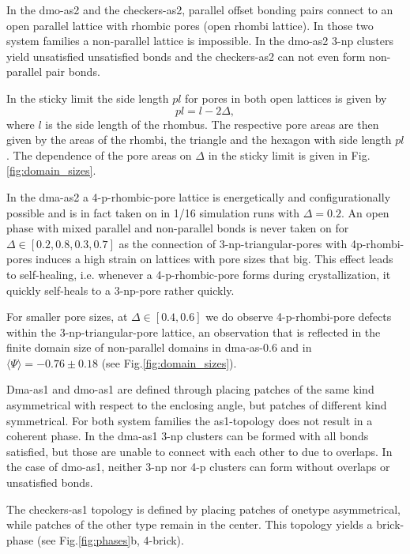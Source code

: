 \documentclass[a4paper,twocolumn]{revtex4}
\begin{document}
In the dmo-as2 and the checkers-as2, parallel offset bonding pairs connect to an open parallel lattice with rhombic pores (open rhombi lattice).
In those two system families a non-parallel lattice is impossible. In the dmo-as2 3-np clusters yield unsatisfied unsatisfied bonds and the checkers-as2 can not even form non-parallel pair bonds.

In the sticky limit the side length $pl$ for pores in both open lattices is given by 
\begin{equation}
pl = l - 2\Delta,
\end{equation}
where $l$ is the side length of the rhombus. 
The respective pore areas are then given by the areas of the rhombi,  the triangle and the hexagon with side length $pl$. The dependence of the pore areas on $\Delta$ in the sticky limit is given in Fig.\ref{fig:domain_sizes}.

In the dma-as2 a 4-p-rhombic-pore lattice is energetically and configurationally possible and is in fact taken on in 
1/16 simulation runs with $\Delta=0.2$.
An open phase with mixed parallel and non-parallel bonds is never taken on for $\Delta\in[0.2,0.8,0.3,0.7]$ as the connection of  3-np-triangular-pores with 4p-rhombi-pores induces a high strain on lattices with pore sizes that big.
This effect leads to self-healing, i.e. whenever a 4-p-rhombic-pore forms during crystallization, it quickly self-heals to a 3-np-pore rather quickly.

For smaller pore sizes, at $\Delta\in[0.4,0.6]$ we do observe 4-p-rhombi-pore defects within the 3-np-triangular-pore lattice, an observation that is reflected in the finite domain size of non-parallel domains in dma-as-0.6 and in $\langle\Psi\rangle=-0.76\pm0.18$ (see Fig.\ref{fig:domain_sizes}).

Dma-as1 and dmo-as1 are defined through placing patches of the same kind asymmetrical with respect to the enclosing angle, but patches of different kind symmetrical. 
For both system families the as1-topology does not result in a coherent phase. 
In the dma-as1 3-np clusters can be formed with all bonds satisfied, but those are unable to connect with each other to due to overlaps.  
In the case of dmo-as1, neither 3-np nor 4-p clusters can form without overlaps or unsatisfied bonds. 

The checkers-as1 topology is defined by placing patches of onetype asymmetrical, while patches of the other type remain in the center. This topology yields a brick-phase (see Fig.\ref{fig:phases}b, 4-brick).  
\end{document}
